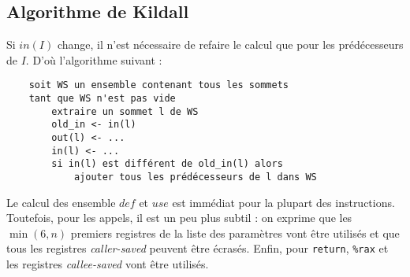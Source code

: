 \documentclass{cours}
\begin{document}
\subsection{Algorithme de Kildall}
Si $in(I)$ change, il n'est nécessaire de refaire le calcul que pour les prédécesseurs de $I$.  D'où l'algorithme suivant : 
\begin{verbatim}
    soit WS un ensemble contenant tous les sommets
    tant que WS n'est pas vide
        extraire un sommet l de WS
        old_in <- in(l)
        out(l) <- ...
        in(l) <- ...
        si in(l) est différent de old_in(l) alors
            ajouter tous les prédécesseurs de l dans WS
\end{verbatim}

Le calcul des ensemble $def$ et $use$ est immédiat pour la plupart des instructions. Toutefois, pour les appels, il est un peu plus subtil : on exprime que les $\min(6, n)$ premiers registres de la liste des paramètres vont être utilisés et que tous les registres \textit{caller-saved} peuvent être écrasés. Enfin, pour \texttt{return}, \texttt{\%rax} et les registres \textit{callee-saved} vont être utilisés.
\end{document}
